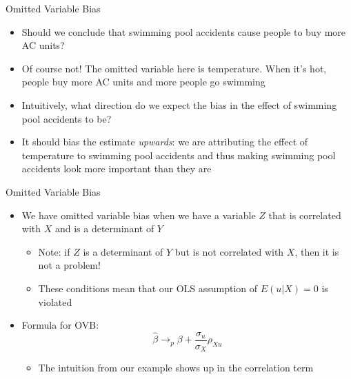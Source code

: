 \documentclass[aspectratio=169]{beamer}
\begin{document}
\begin{frame}{Omitted Variable Bias}
    \begin{itemize}
        \item Should we conclude that swimming pool accidents cause people to buy more AC units?
        \item Of course not! The omitted variable here is temperature. When it's hot, people buy more AC units and more people go swimming
        \item Intuitively, what direction do we expect the bias in the effect of swimming pool accidents to be?
        \item It should bias the estimate \textit{upwards}: we are attributing the effect of temperature to swimming pool accidents and thus making swimming pool accidents look more important than they are
    \end{itemize}
\end{frame}

\begin{frame}{Omitted Variable Bias}
    \begin{itemize}
        \item We have omitted variable bias when we have a variable $Z$ that is correlated with $X$ and is a determinant of $Y$
        \begin{itemize}
            \item Note: if $Z$ is a determinant of $Y$ but is not correlated with $X$, then it is not a problem!
            \item These conditions mean that our OLS assumption of $E(u|X) = 0$ is violated
        \end{itemize}
        \item Formula for OVB:
        $$
        \hat{\beta} \to_{p} \beta + \frac{\sigma_u}{\sigma_X}\rho_{Xu}
        $$
        \begin{itemize}
            \item The intuition from our example shows up in the correlation term
        \end{itemize}
    \end{itemize}
\end{frame}
\end{document}
